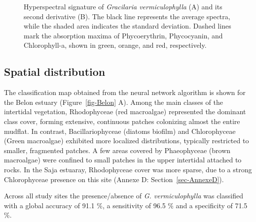 \documentclass[
  letterpaper,
  11pt,
  english,
  singlespacing,
  headsepline]{MastersDoctoralThesis}
\begin{document}
\begin{spacing}{1.5}
\begin{figure}


\caption{\label{fig-SpecDescri}Hyperspectral signature of
\emph{Gracilaria vermiculophylla} (A) and its second derivative (B). The
black line represents the average spectra, while the shaded area
indicates the standard deviation. Dashed lines mark the absorption
maxima of Phycoerythrin, Phycocyanin, and Chlorophyll-a, shown in green,
orange, and red, respectively.}

\end{figure}%

\subsection{Spatial distribution}\label{spatial-distribution}

The classification map obtained from the neural network algorithm is
shown for the Belon estuary (Figure~\ref{fig-Belon} A). Among the main
classes of the intertidal vegetation, Rhodophyceae (red macroalgae)
represented the dominant class cover, forming extensive, continuous
patches colonizing almost the entire mudflat. In contrast,
Bacillariophyceae (diatoms biofilm) and Chlorophyceae (Green macroalgae)
exhibited more localized distributions, typically restricted to smaller,
fragmented patches. A few areas covered by Phaeophyceae (brown
macroalgae) were confined to small patches in the upper intertidal
attached to rocks. In the Saja estuaray, Rhodophyceae cover was more
sparse, due to a strong Chlorophyceae presence on this site (Annexe D:
Section~\ref{sec-AnnexeD}).

Across all study sites the presence/absence of \emph{G. vermiculophylla}
was classified with a global accuracy of 91.1 \%, a sensitivity of 96.5
\% and a specificity of 71.5 \%.


\end{spacing}
\end{document}
